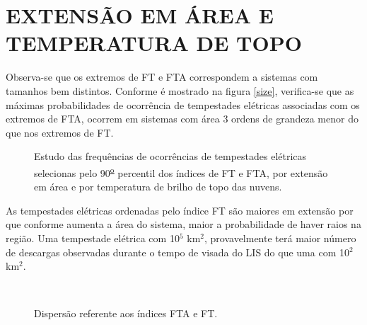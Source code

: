 


\section{EXTENSÃO EM ÁREA E TEMPERATURA DE TOPO}

Observa-se que os extremos de FT e FTA correspondem a sistemas com tamanhos bem distintos. Conforme é mostrado na figura \ref{size}, verifica-se que as máximas probabilidades de ocorrência de tempestades elétricas associadas com os extremos de FTA, ocorrem em sistemas com área 3 ordens de grandeza menor do que nos extremos de FT.

\begin{figure}[!hb]
  \label{t_tb}
  \caption{Estudo das frequências de ocorrências de tempestades elétricas selecionas pelo 90\textsuperscript{\underline{o}} percentil dos índices de FT e FTA, por extensão em área e por temperatura de brilho de topo das nuvens.}
\end{figure}


As tempestades elétricas ordenadas pelo índice FT são maiores em extensão por que conforme aumenta a área do sistema, maior a probabilidade de haver raios na região. Uma tempestade elétrica com 10$^5$ km$^2$, provavelmente terá maior número de descargas observadas durante o tempo de visada do LIS do que uma com 10$^2$ km$^2$.



\begin{figure}[!hb]
  \centering 
   \\
  \caption{Dispersão referente aos índices FTA e FT.}
  \label{seriesFtaFt}
\end{figure}

